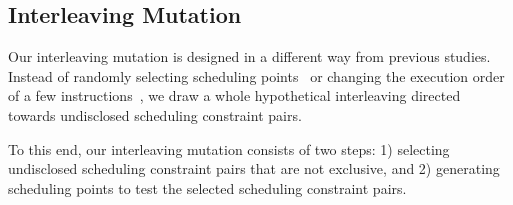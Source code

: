 \subsection{Interleaving Mutation}
\label{ss:scheduler}

\newcommand{\segment}{segment graph\xspace}
\newcommand{\segments}{segment graphs\xspace}
\newcommand{\Segments}{Segment graphs\xspace}

%







Our interleaving mutation is designed in a different way from previous
studies.
%
Instead of randomly selecting scheduling points~\cite{krace, ski} or
changing the execution order of a few instructions~\cite{razzer,
  snowboard}, we draw a whole hypothetical interleaving directed
towards undisclosed scheduling constraint pairs.

To this end, our interleaving mutation consists of two steps:
%
1) selecting undisclosed scheduling constraint pairs that are not
exclusive, and 2) generating scheduling points to test the selected
scheduling constraint pairs.


